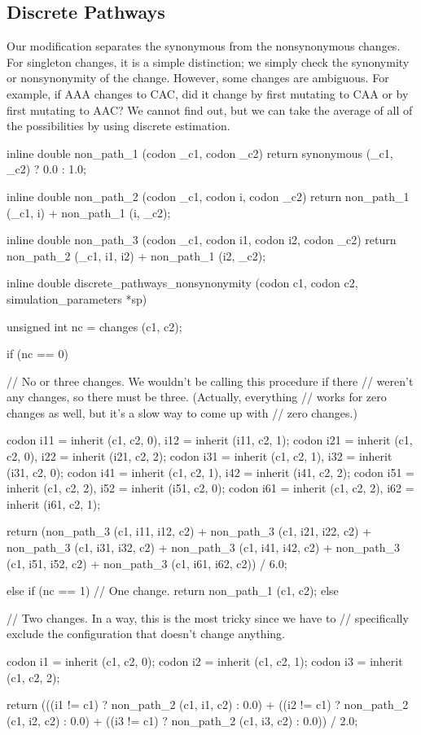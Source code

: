 \documentclass{article}
\begin{document}
    \subsection{Discrete Pathways}
      \label{sec:pathways}

      Our modification separates the synonymous from the nonsynonymous changes.
      For singleton changes, it is a simple distinction; we simply check the
      synonymity or nonsynonymity of the change. However, some changes are
      ambiguous. For example, if AAA changes to CAC, did it change by first
      mutating to CAA or by first mutating to AAC? We cannot find out, but we
      can take the average of all of the possibilities by using discrete
      estimation.

\begin{ccode}
inline double non_path_1 (codon _c1, codon _c2)
  {return synonymous (_c1, _c2) ? 0.0 : 1.0;}

inline double non_path_2 (codon _c1, codon i, codon _c2)
  {return non_path_1 (_c1, i) + non_path_1 (i, _c2);}

inline double non_path_3 (codon _c1, codon i1, codon i2, codon _c2)
  {return non_path_2 (_c1, i1, i2) + non_path_1 (i2, _c2);}

inline double discrete_pathways_nonsynonymity (codon c1, codon c2, simulation_parameters *sp) {
  unsigned int nc = changes (c1, c2);

  if (nc == 0) {
    // No or three changes. We wouldn't be calling this procedure if there
    // weren't any changes, so there must be three. (Actually, everything
    // works for zero changes as well, but it's a slow way to come up with
    // zero changes.)

    codon i11 = inherit (c1, c2, 0), i12 = inherit (i11, c2, 1);
    codon i21 = inherit (c1, c2, 0), i22 = inherit (i21, c2, 2);
    codon i31 = inherit (c1, c2, 1), i32 = inherit (i31, c2, 0);
    codon i41 = inherit (c1, c2, 1), i42 = inherit (i41, c2, 2);
    codon i51 = inherit (c1, c2, 2), i52 = inherit (i51, c2, 0);
    codon i61 = inherit (c1, c2, 2), i62 = inherit (i61, c2, 1);

    return (non_path_3 (c1, i11, i12, c2) + non_path_3 (c1, i21, i22, c2) +
	    non_path_3 (c1, i31, i32, c2) + non_path_3 (c1, i41, i42, c2) +
	    non_path_3 (c1, i51, i52, c2) + non_path_3 (c1, i61, i62, c2)) / 6.0;
  } else if (nc == 1)
    // One change.
    return non_path_1 (c1, c2);
  else {
    // Two changes. In a way, this is the most tricky since we have to
    // specifically exclude the configuration that doesn't change anything.

    codon i1 = inherit (c1, c2, 0);
    codon i2 = inherit (c1, c2, 1);
    codon i3 = inherit (c1, c2, 2);

    return (((i1 != c1) ? non_path_2 (c1, i1, c2) : 0.0) +
	    ((i2 != c1) ? non_path_2 (c1, i2, c2) : 0.0) +
	    ((i3 != c1) ? non_path_2 (c1, i3, c2) : 0.0)) / 2.0;
  }
}
\end{ccode}
\end{document}

